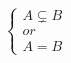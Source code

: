 \documentclass[preview]{standalone}
\begin{document}
\begin{align*}
\begin{cases}
                         A \subsetneq B\\
                         or\\
                         A = B
                         \end{cases}
\end{align*}
\end{document}

